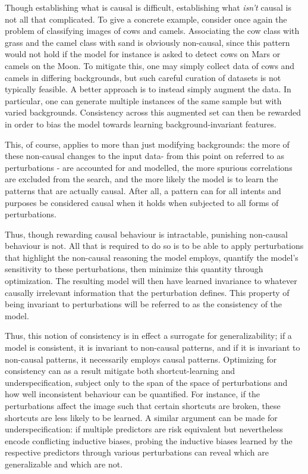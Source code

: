 Though establishing what is causal is difficult, establishing what \textit{isn't} causal is not all that complicated. To give a concrete example, consider once again the problem of classifying images of cows and camels. Associating the cow class with grass and the camel class with sand is obviously non-causal, since this pattern would not hold if the model for instance is asked to detect cows on Mars or camels on the Moon. To mitigate this, one may simply collect data of cows and camels in differing backgrounds, but such careful curation of datasets is not typically feasible. A better approach is to instead simply augment the data. In particular, one can generate multiple instances of the same sample but with varied backgrounds. Consistency across this augmented set can then be rewarded in order to bias the model towards learning background-invariant features. 

This, of course, applies to more than just modifying backgrounds: the more of these non-causal changes to the input data-  from this point on referred to as perturbations - are accounted for and modelled, the more spurious correlations are excluded from the search, and the more likely the model is to learn the patterns that are actually causal. After all, a pattern can for all intents and purposes be considered causal when it holds when subjected to all forms of perturbations. 

Thus, though rewarding causal behaviour is intractable, punishing non-causal behaviour is not. All that is required to do so is to be able to apply perturbations that highlight the non-causal reasoning the model employs, quantify the model's sensitivity to these perturbations, then minimize this quantity through optimization. The resulting model will then have learned invariance to whatever causally irrelevant information that the perturbation defines. This property of being invariant to perturbations will be referred to as the consistency of the model. 

Thus, this notion of consistency is in effect a surrogate for generalizability; if a model is consistent, it is invariant to non-causal patterns, and if it is invariant to non-causal patterns, it necessarily employs causal patterns. Optimizing for consistency can as a result mitigate both shortcut-learning and underspecification, subject only to the span of the space of perturbations and how well inconsistent behaviour can be quantified. For instance, if the perturbations affect the image such that certain shortcuts are broken, these shortcuts are less likely to be learned. A similar argument can be made for underspecification: if multiple predictors are risk equivalent but nevertheless encode conflicting inductive biases, probing the inductive biases learned by the respective predictors through various perturbations can reveal which are generalizable and which are not.

